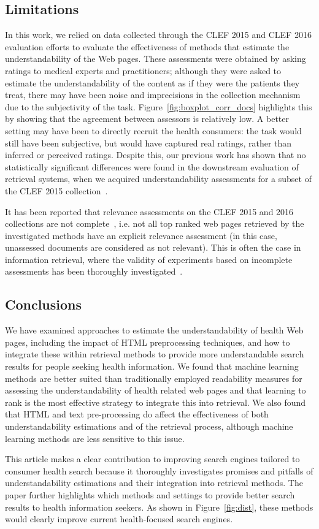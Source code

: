 \subsection*{Limitations}
In this work, we relied on data collected through the CLEF 2015 and CLEF 2016 evaluation efforts to evaluate the effectiveness of methods that estimate the understandability of the Web pages. These assessments were obtained by asking ratings to medical experts and practitioners; although they were asked to estimate the understandability of the content as if they were the patients they treat, there may have been noise and imprecisions in the collection mechanism due to the subjectivity of the
task. Figure~\ref{fig:boxplot_corr_docs} highlights this by showing that the agreement between assessors is relatively low. A better setting may have been to directly recruit the health consumers: the task would still have been subjective, but would have captured real ratings, rather than inferred or perceived ratings. Despite this, our previous work has shown that no statistically significant differences were found in the downstream evaluation of retrieval systems, when we acquired understandability assessments for a subset of the CLEF 2015 collection~\cite{palotti16b}. 

It has been reported that relevance assessments on the CLEF 2015 and 2016 collections are not complete~\cite{clef15,clef16}, i.e. not all top ranked web pages retrieved by the investigated methods have an explicit relevance assessment (in this case, unassessed documents are considered as not relevant). This is often the case in information retrieval, where the validity of experiments based on incomplete assessments has been thoroughly investigated~\cite{sanderson2010test}. 

\subsection*{Conclusions}

We have examined approaches to estimate the understandability of health Web pages, including the impact of HTML preprocessing techniques, and how to integrate these within retrieval methods to provide more understandable search results for people seeking health information. We found that machine learning methods are better suited than traditionally employed readability measures for assessing the understandability of health related web pages and that learning to rank is the most effective
strategy to integrate this into retrieval. We also found that HTML and text pre-processing do affect the effectiveness of both understandability estimations and of the retrieval process, although machine learning methods are less sensitive to this issue.

This article makes a clear contribution to improving search engines tailored to consumer health search because it thoroughly investigates promises and pitfalls of understandability estimations and their integration into retrieval methods. The paper further highlights which methods and settings to provide better search results to health information seekers. As shown in Figure~\ref{fig:dist}, these methods would clearly improve current health-focused search engines. 
